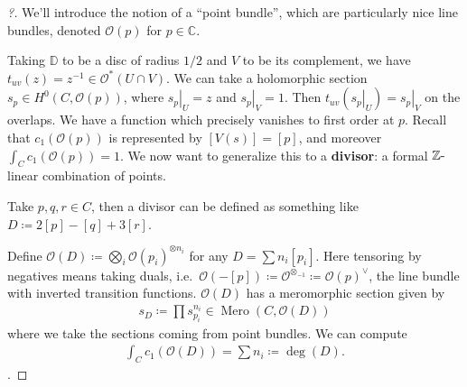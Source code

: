 \begin{proof}[?]

We'll introduce the notion of a ``point bundle'', which are particularly
nice line bundles, denoted \({\mathcal{O}}(p)\) for
\(p\in {\mathbb{C}}\).

\begin{figure}
\centering
{}
\end{figure}

Taking \({\mathbb{D}}\) to be a disc of radius \(1/2\) and \(V\) to be
its complement, we have
\(t_{uv}(z) = z^{-1}\in {\mathcal{O}}^*(U \cap V)\). We can take a
holomorphic section \(s_p \in H^0( C, {\mathcal{O}}(p) )\), where
\({ \left.{{s_p}} \right|_{{U}} } = z\) and
\({ \left.{{s_p}} \right|_{{V}} } = 1\). Then
\(t_{uv}( { \left.{{s_p}} \right|_{{U}} } ) = { \left.{{s_p}} \right|_{{V}} }\)
on the overlaps. We have a function which precisely vanishes to first
order at \(p\). Recall that \(c_1( {\mathcal{O}}(p) )\) is represented
by \([ V(s) ] = [p]\), and moreover
\(\int_C c_1 ( {\mathcal{O}}(p) ) = 1\). We now want to generalize this
to a \textbf{divisor}: a formal \({\mathbb{Z}}{\hbox{-}}\)linear
combination of points.

\begin{example}[?]

Take \(p, q,r\in C\), then a divisor can be defined as something like
\(D \coloneqq 2[p] - [q] + 3[r]\).

\end{example}

Define
\({\mathcal{O}}(D) \coloneqq\bigotimes_{i} {\mathcal{O}}(p_i)^{\otimes n_i}\)
for any \(D = \sum n_i [p_i]\). Here tensoring by negatives means taking
duals,
i.e.~\({\mathcal{O}}( -[p] ) \coloneqq{\mathcal{O}}^{\otimes_{-1}} \coloneqq{\mathcal{O}}(p)^\vee\),
the line bundle with inverted transition functions. \({\mathcal{O}}(D)\)
has a meromorphic section given by
\begin{align*}
s_D \coloneqq\prod s_{p_i}^{n_i} \in \operatorname{Mero}(C, {\mathcal{O}}(D) )
\end{align*}
where we take the sections coming from point bundles. We can compute
\begin{align*}
\int_C c_1 ( {\mathcal{O}}(D) ) = \sum n_i \coloneqq\deg(D)
.\end{align*}
.


\end{proof}
